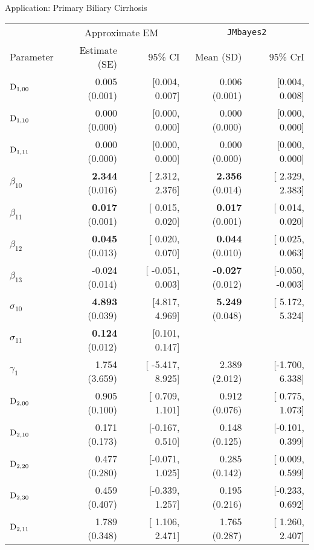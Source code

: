 \begin{chapter}{\label{cha:app-PBC}Application: Primary Biliary Cirrhosis}
  \begin{table}[ht]
    \centering
    \captionsetup{font=scriptsize}
    \begingroup\scriptsize
    \begin{tabular}{lrrrr}
        & \multicolumn{2}{c}{Approximate EM} & \multicolumn{2}{c}{\tt{JMbayes2}}\\
        Parameter & Estimate (SE) & 95\% CI & Mean (SD) & 95\% CrI \\
        \hline
        $\mathrm{D}_{1,00}$ & 0.005 (0.001) & [0.004, 0.007] & 0.006 (0.001) & [0.004, 0.008] \\ 
        $\mathrm{D}_{1,10}$ & 0.000 (0.000) & [0.000, 0.000] & 0.000 (0.000) & [0.000, 0.000] \\ 
        $\mathrm{D}_{1,11}$ & 0.000 (0.000) & [0.000, 0.000] & 0.000 (0.000) & [0.000, 0.000] \\ 
        $\beta_{10}$ &   \textbf{2.344} (0.016) & [  2.312,   2.376] &  \textbf{2.356} (0.014) & [ 2.329,  2.383] \\ 
        $\beta_{11}$ &   \textbf{0.017} (0.001) & [  0.015,   0.020] &  \textbf{0.017} (0.001) & [ 0.014,  0.020] \\ 
        $\beta_{12}$ &   \textbf{0.045} (0.013) & [  0.020,   0.070] &  \textbf{0.044} (0.010) & [ 0.025,  0.063] \\ 
        $\beta_{13}$ &  -0.024 (0.014) & [ -0.051,   0.003] & \textbf{-0.027} (0.012) & [-0.050, -0.003] \\ 
        $\sigma_{10}$ & \textbf{4.893} (0.039) & [4.817, 4.969] &  \textbf{5.249} (0.048) & [ 5.172,  5.324] \\ 
        $\sigma_{11}$ &   \textbf{0.124} (0.012) & [0.101, 0.147] &  {} & {} \\ %
        $\gamma_1$ &   1.754 (3.659) & [ -5.417,   8.925] &  2.389 (2.012) & [-1.700,  6.338] \\ 
        \hdashline
        $\mathrm{D}_{2,00}$ & 0.905 (0.100) & [ 0.709, 1.101] & 0.912 (0.076) & [ 0.775, 1.073] \\ 
        $\mathrm{D}_{2,10}$ & 0.171 (0.173) & [-0.167, 0.510] & 0.148 (0.125) & [-0.101, 0.399] \\ 
        $\mathrm{D}_{2,20}$ & 0.477 (0.280) & [-0.071, 1.025] & 0.285 (0.142) & [ 0.009, 0.599] \\ 
        $\mathrm{D}_{2,30}$ & 0.459 (0.407) & [-0.339, 1.257] & 0.195 (0.216) & [-0.233, 0.692] \\ 
        $\mathrm{D}_{2,11}$ & 1.789 (0.348) & [ 1.106, 2.471] & 1.765 (0.287) & [ 1.260, 2.407] \\ 

\end{tabular}
\end{table}
\end{chapter}
